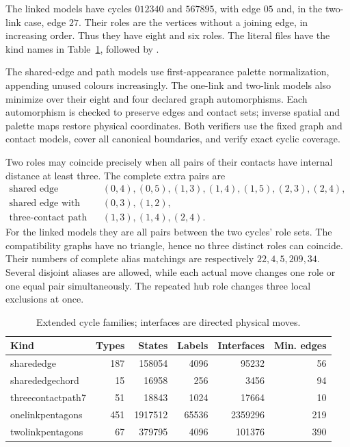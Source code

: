 \documentclass[11pt]{article}
\numberwithin{equation}{section}
\numberwithin{table}{section}
\begin{document}
The linked models have cycles $012340$ and $567895$, with edge $05$
and, in the two-link case, edge $27$. Their roles are the vertices
without a joining edge, in increasing order. Thus they have eight
and six roles. The literal files have the kind names in
Table~\ref{tab:extended-cycle-counts}, followed by .

The shared-edge and path models use first-appearance palette
normalization, appending unused colours increasingly. The one-link
and two-link models also minimize over their eight and four declared
graph automorphisms. Each automorphism is checked to preserve edges
and contact sets; inverse spatial and palette maps restore physical
coordinates. Both verifiers use the fixed graph and contact models, cover all
canonical boundaries, and verify exact cyclic coverage.

Two roles may coincide precisely when all pairs of their contacts
have internal distance at least three. The complete extra pairs are
\[
\begin{array}{cl}
\text{shared edge}&(0,4),(0,5),(1,3),(1,4),(1,5),(2,3),(2,4),\\
\text{shared edge with chord}&(0,3),(1,2),\\
\text{three-contact path}&(1,3),(1,4),(2,4).
\end{array}
\]
For the linked models they are all pairs between the two cycles'
role sets. The compatibility graphs have no triangle, hence no
three distinct roles can coincide. Their numbers of complete alias
matchings are respectively $22,4,5,209,34$. Several disjoint aliases
are allowed, while each actual move changes one role or one equal
pair simultaneously. The repeated hub role changes three local
exclusions at once.

\begin{table}[htbp]
\centering\small
\caption{Extended cycle families; interfaces are directed physical moves.}
\label{tab:extended-cycle-counts}
\begin{tabular}{lrrrrr}
\toprule
Kind & Types & States & Labels & Interfaces & Min. edges\\
\midrule
sharededge&187&158054&4096&95232&56\\
sharededgechord&15&16958&256&3456&94\\
threecontactpath7&51&18843&1024&17664&10\\
onelinkpentagons&451&1917512&65536&2359296&219\\
twolinkpentagons&67&379795&4096&101376&390\\
\bottomrule
\end{tabular}
\end{table}
\end{document}
